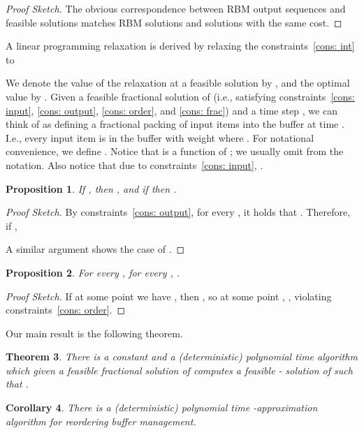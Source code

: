 \documentclass[11pt]{article}
\newtheorem{theorem}{Theorem}[section]
\newtheorem{corollary}[theorem]{Corollary}
\newtheorem{proposition}[theorem]{Proposition}
\newenvironment{proofsketch}{\begin{proof}[Proof Sketch]}{\end{proof}}
\begin{document}
\begin{proofsketch}
The obvious correspondence between RBM output sequences and feasible
 solutions matches RBM solutions and  solutions with the same
cost.
\end{proofsketch}

A linear programming relaxation  is derived by relaxing the
constraints~\eqref{cons: int} to

We denote the value of the relaxation at a feasible solution  by ,
and the optimal value by .
Given a feasible fractional solution  of  (i.e.,  satisfying
constraints~\eqref{cons: input}, \eqref{cons: output}, \eqref{cons: order},
and \eqref{cons: frac}) and a time step , we can think of  as defining
a fractional packing of input items into the buffer at time . I.e., every
input item  is in the buffer with weight 
where . For notational convenience, we
define . Notice that  is a function of ; we usually
omit  from the notation. Also notice that due to
constraints~\eqref{cons: input}, .
\begin{proposition}\label{pr: capacity constraint}
If , then ,
and if  then .
\end{proposition}

\begin{proofsketch}
By constraints~\eqref{cons: output}, for every ,
it holds that . Therefore, if ,

A similar argument shows the case of .
\end{proofsketch}

\begin{proposition}\label{pr: monotonicity of w}
For every , for every , .
\end{proposition}

\begin{proofsketch}
If at some point  we have , then
, so at some point ,
, violating constraints~\eqref{cons: order}.
\end{proofsketch}

Our main result is the following theorem.
\begin{theorem}\label{thm: main}
There is a constant  and a (deterministic) polynomial time
algorithm which given a feasible fractional solution  of  computes
a feasible - solution  of  such that
.
\end{theorem}

\begin{corollary}\label{cor: main}
There is a (deterministic) polynomial time -approximation
algorithm for reordering buffer management.
\end{corollary}
\end{document}
